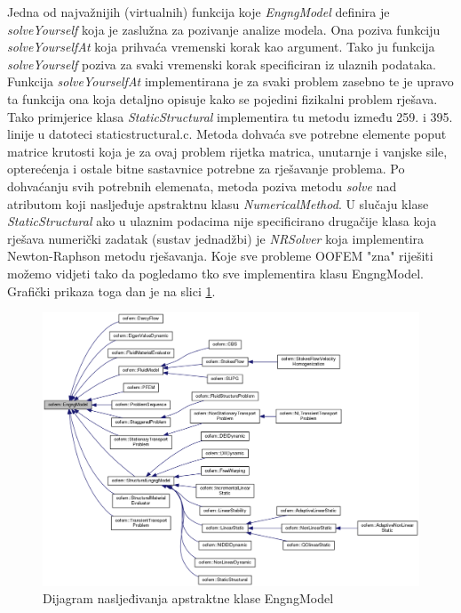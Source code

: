 \documentclass[a4paper,twoside,12pt]{memoir} %
\begin{document}
Jedna od najvažnijih (virtualnih) funkcija koje \textit{EngngModel} definira je \textit{solveYourself} koja je zaslužna za pozivanje analize modela. Ona poziva funkciju \textit{solveYourselfAt} koja prihvaća vremenski korak kao argument. Tako ju funkcija \textit{solveYourself} poziva za svaki vremenski korak specificiran iz ulaznih podataka. Funkcija \textit{solveYourselfAt} implementirana je za svaki problem zasebno te je upravo ta funkcija ona koja detaljno opisuje kako se pojedini fizikalni problem rješava. Tako primjerice klasa \textit{StaticStructural} implementira tu metodu između 259. i 395. linije u datoteci staticstructural.c. Metoda dohvaća sve potrebne elemente poput matrice krutosti koja je za ovaj problem rijetka matrica, unutarnje i vanjske sile, opterećenja i ostale bitne sastavnice potrebne za rješavanje problema. Po dohvaćanju svih potrebnih elemenata, metoda poziva metodu \textit{solve} nad atributom koji nasljeđuje apstraktnu klasu \textit{NumericalMethod}. U slučaju klase \textit{StaticStructural} ako u ulaznim podacima nije specificirano drugačije klasa koja rješava numerički zadatak (sustav jednadžbi) je \textit{NRSolver} koja implementira Newton-Raphson metodu rješavanja. Koje sve probleme OOFEM "zna" riješiti možemo vidjeti tako da pogledamo tko sve implementira klasu EngngModel. Grafički prikaza toga dan je na slici \ref{fig:engngModel_inheritance}.

\begin{figure}[h!t]
\begin{center}
\includegraphics[scale=0.38]{pictures/chapter_oofem/EngngModel_inheritance.png}
\caption{Dijagram nasljeđivanja apstraktne klase EngngModel \cite{oofem_reference}}
\label{fig:engngModel_inheritance}
\end{center}
\end{figure}
\end{document}

